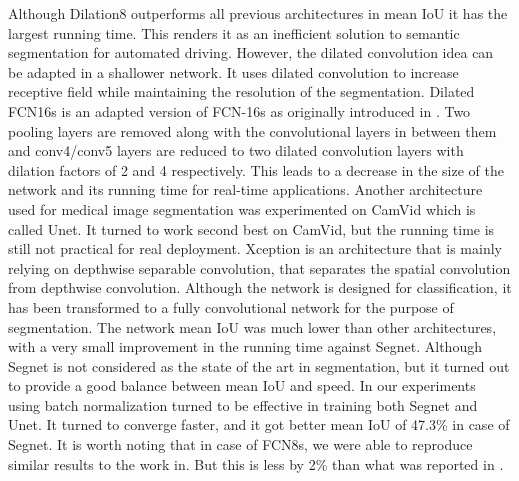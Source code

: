\documentclass[conference]{IEEEtran}
\begin{document}
Although Dilation8 outperforms all previous architectures in mean IoU it has the largest running time. This renders it as an inefficient solution to semantic segmentation for automated driving. However, the dilated convolution idea can be adapted in a shallower network. It uses dilated convolution to increase receptive field while maintaining the resolution of the segmentation. Dilated FCN16s is an adapted version of FCN-16s as originally introduced in \cite{long2015fully}. Two pooling layers are removed along with the convolutional layers in between them and conv4/conv5 layers are reduced to two dilated convolution layers with dilation factors of 2 and 4 respectively. This leads to a decrease in the size of the network and its running time for real-time applications. Another architecture used for medical image segmentation was experimented on CamVid which is called Unet. It turned to work second best on CamVid, but the running time is still not practical for real deployment. Xception \cite{chollet2016xception} is an architecture that is mainly relying on depthwise separable convolution, that separates the spatial convolution from depthwise convolution. Although the network is designed for classification, it has been transformed to a fully convolutional network for the purpose of segmentation. The network mean IoU was much lower than other architectures, with a very small improvement in the running time against Segnet. Although Segnet is not considered as the state of the art in segmentation, but it turned out to provide a good balance between mean IoU and speed. In our experiments using batch normalization \cite{ioffe2015batch} turned to be effective in training both Segnet and Unet. It turned to converge faster, and it got better mean IoU of 47.3\% in case of Segnet. It is worth noting that in case of FCN8s, we were able to reproduce similar results to the work in\cite{FayyazSSFK16}. But this is less by 2\% than what was reported in \cite{DBLP:journals/corr/KendallBC15}. 
\end{document}
